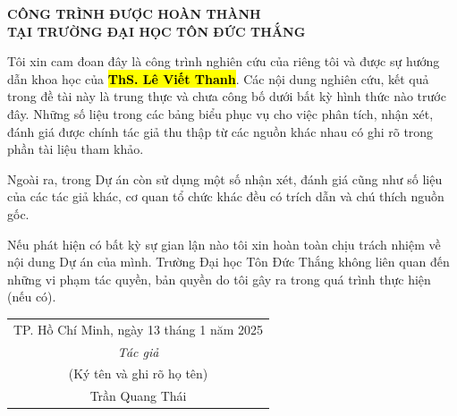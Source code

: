 \begin{center}
\pagestyle{empty}  %
\textbf{\Large CÔNG TRÌNH ĐƯỢC HOÀN THÀNH}\\
\vspace{0.5cm} %
\Large \textbf{TẠI TRƯỜNG ĐẠI HỌC TÔN ĐỨC THẮNG}
\end{center}

\vspace{1cm} %

Tôi xin cam đoan đây là công trình nghiên cứu của riêng tôi và được sự hướng dẫn khoa học của \hl{\textbf{ThS. Lê Viết Thanh}}. Các nội dung nghiên cứu, kết quả trong đề tài này là trung thực và chưa công bố dưới bất kỳ hình thức nào trước đây. Những số liệu trong các bảng biểu phục vụ cho việc phân tích, nhận xét, đánh giá được chính tác giả thu thập từ các nguồn khác nhau có ghi rõ trong phần tài liệu tham khảo.

Ngoài ra, trong Dự án còn sử dụng một số nhận xét, đánh giá cũng như số liệu của các tác giả khác, cơ quan tổ chức khác đều có trích dẫn và chú thích nguồn gốc.

Nếu phát hiện có bất kỳ sự gian lận nào tôi xin hoàn toàn chịu trách nhiệm về nội dung Dự án của mình. Trường Đại học Tôn Đức Thắng không liên quan đến những vi phạm tác quyền, bản quyền do tôi gây ra trong quá trình thực hiện (nếu có).


 \begin{flushright}
\begin{tabular}{c}
    \multicolumn{1}{r}{TP. Hồ Chí Minh, ngày 13 tháng 1 năm 2025}\\
    \noalign{\vspace{0.5cm}}
    \textit{Tác giả} \\
    (Ký tên và ghi rõ họ tên) \\
    \noalign{\vspace{2cm}}
    Trần Quang Thái \\
\end{tabular}

\end{flushright}